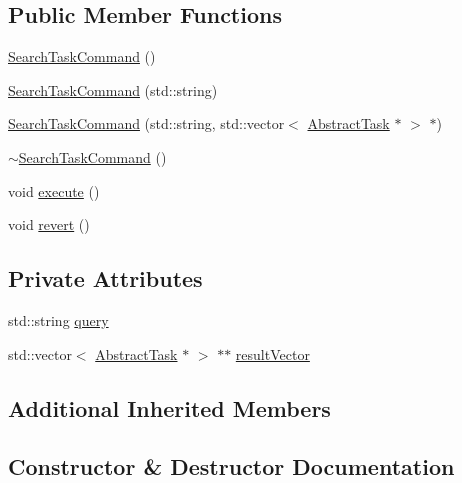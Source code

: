 \subsection*{Public Member Functions}
\begin{DoxyCompactItemize}
\item 
\hyperlink{class_do_lah_1_1_search_task_command_afedeabdae9bb5ce365945cb5bb348f39}{Search\+Task\+Command} ()
\item 
\hyperlink{class_do_lah_1_1_search_task_command_ae4db6dcbd2927596a126b8ca0eb8e81a}{Search\+Task\+Command} (std\+::string)
\item 
\hyperlink{class_do_lah_1_1_search_task_command_a1faf946bb97736a54adfd75cc3bebdb5}{Search\+Task\+Command} (std\+::string, std\+::vector$<$ \hyperlink{class_do_lah_1_1_abstract_task}{Abstract\+Task} $\ast$ $>$ $\ast$)
\item 
\hyperlink{class_do_lah_1_1_search_task_command_ae238384cee8c09083def88725b0b2d7b}{$\sim$\+Search\+Task\+Command} ()
\item 
void \hyperlink{class_do_lah_1_1_search_task_command_a29dec8cac9a658f3885f4a566a114485}{execute} ()
\item 
void \hyperlink{class_do_lah_1_1_search_task_command_a609e103cc1c0657225bff0c0420e7172}{revert} ()
\end{DoxyCompactItemize}
\subsection*{Private Attributes}
\begin{DoxyCompactItemize}
\item 
std\+::string \hyperlink{class_do_lah_1_1_search_task_command_a59f503319380f50d33eeb389f2e3208b}{query}
\item 
std\+::vector$<$ \hyperlink{class_do_lah_1_1_abstract_task}{Abstract\+Task} $\ast$ $>$ $\ast$$\ast$ \hyperlink{class_do_lah_1_1_search_task_command_ab57f29ebbae60c4a5d71fdf75a8621cd}{result\+Vector}
\end{DoxyCompactItemize}
\subsection*{Additional Inherited Members}


\subsection{Constructor \& Destructor Documentation}
\hypertarget{class_do_lah_1_1_search_task_command_afedeabdae9bb5ce365945cb5bb348f39}{}
